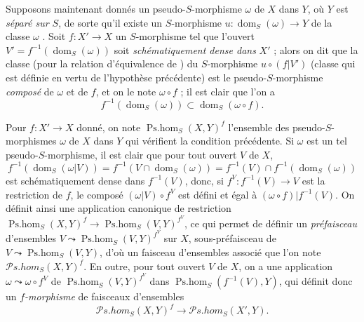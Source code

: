 \begin{env}[20.3.2]
Supposons maintenant donnés un pseudo-$S$-morphisme $\omega$ de $X$ dans $Y$, où $Y$ est \emph{séparé sur $S$}, de sorte qu'il existe un $S$-morphisme $u:\operatorname{dom}_S(\omega)\to Y$ de la classe $\omega$ .
Soit $f:X'\to X$ un $S$-morphisme tel que l'ouvert $V'=f^{-1}(\operatorname{dom}_S(\omega))$ soit \emph{schématiquement dense dans} $X'$ ; alors on dit que la classe (pour la relation d'équivalence de ) du $S$-morphisme $u\circ(f|V')$ (classe qui est définie en vertu de l'hypothèse précédente) est le pseudo-$S$-morphisme \emph{composé} de $\omega$ et de $f$, et on le note $\omega\circ f$ ; il est clair que l'on a
\[
\label{IV.20.3.2.1}
  f^{-1}(\operatorname{dom}_S(\omega))\subset\operatorname{dom}_S(\omega\circ f).
  \tag{20.3.2.1}
\]

Pour $f:X'\to X$ donné, on note $\operatorname{Ps.hom}_S(X,Y)^f$ l'ensemble des pseudo-$S$-morphismes $\omega$ de $X$ dans $Y$ qui vérifient la condition précédente.
Si $\omega$ est un tel pseudo-$S$-morphisme, il est clair que pour tout ouvert $V$ de $X$,
\[
  f^{-1}(\operatorname{dom}_S(\omega|V))=f^{-1}(V\cap\operatorname{dom}_S(\omega))=f^{-1}(V)\cap f^{-1}(\operatorname{dom}_S(\omega))
\]
est schématiquement dense dans $f^{-1}(V)$, donc, si $f^V:f^{-1}(V)\to V$ est la restriction de $f$, le composé $(\omega|V)\circ f^V$ est défini et égal à $(\omega\circ f)|f^{-1}(V)$.
On définit ainsi une
application canonique de restriction $\operatorname{Ps.hom}_S(X,Y)^f\to\operatorname{Ps.hom}_S(V,Y)^{f^V}$, ce qui permet de définir un \emph{préfaisceau} d'ensembles $V\leadsto\operatorname{Ps.hom}_S(V,Y)^{f^V}$ sur $X$, sous-préfaisceau de $V\leadsto\operatorname{Ps.hom}_S(V,Y)$, d'où un faisceau d'ensembles associé que l'on note $\mathscr{P}\!s.\mathit{hom}_S(X,Y)^f$.
En outre, pour tout ouvert $V$ de $X$, on a une application $\omega\leadsto\omega\circ f^V$ de $\operatorname{Ps.hom}_S(V,Y)^{f^V}$ dans $\operatorname{Ps.hom}_S(f^{-1}(V),Y)$, qui définit donc un \emph{$f$-morphisme} de faisceaux d'ensembles
\[
  \mathscr{P}\!s.\mathit{hom}_S(X,Y)^f\to\mathscr{P}\!s.\mathit{hom}_S(X',Y).
\]
\end{env}


